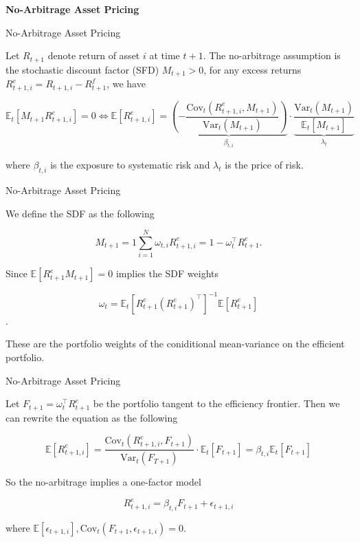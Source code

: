 \documentclass[xcolor={table}, aspectratio=169]{beamer}
\begin{document}
\begin{frame}
	\centering
	\vfill
	{\Large \textbf{No-Arbitrage Asset Pricing}}
	\vfill
\end{frame}

\begin{frame}{No-Arbitrage Asset Pricing}

  Let $R_{t+1}$ denote return of asset $i$ at time $t+1$. The no-arbitrage assumption is the stochastic discount factor (SFD) $M_{t+1}>0$, for any excess returns $R_{t+1,i}^e=R_{t+1,i}-R_{t+1}^f$, we have

  \[\mathbb{E}_t\left[M_{t+1}R_{t+1,i}^e\right]=0\iff \mathbb{E}\left[R_{t+1,i}^e\right]=\underbrace{\left(-\frac{\text{Cov}_t\left(R_{t+1,i}^e,M_{t+1}\right)}{\text{Var}_t(M_{t+1})}\right)}_{\beta_{t,i}}\cdot\underbrace{\frac{\text{Var}_t(M_{t+1})}{\mathbb{E}_t\left[M_{t+1}\right]}}_{\lambda_t}\]

  where $\beta_{t,i}$ is the exposure to systematic risk and $\lambda_t$ is the price of risk. 

\end{frame}

\begin{frame}{No-Arbitrage Asset Pricing}

  We define the SDF as the following

  \[
  M_{t+1}=1\sum_{i=1}^N\omega_{t,i}R_{t+1,i}^e=1-\omega_t^\top R_{t+1}^e.
  \]

  Since $\mathbb{E}\left[R_{t+1}^eM_{t+1}\right]=0$ implies the SDF weights 

  \[\omega_t=\mathbb{E}_t\left[R_{t+1}^e(R^e_{t+1})^\top\right]^{-1}\mathbb{E}\left[R_{t+1}^e\right]\].

  These are the portfolio weights of the coniditional mean-variance on the efficient portfolio.

\end{frame}

\begin{frame}{No-Arbitrage Asset Pricing}

  Let $F_{t+1}=\omega_t^\top R_{t+1}^e$  be the portfolio tangent to the efficiency frontier. Then we can rewrite the equation as the following

  \[
  \mathbb{E}\left[R_{t+1,i}^e\right]=\frac{\text{Cov}_t\left(R_{t+1,i}^e,F_{t+1}\right)}{\text{Var}_t(F_{T+1})}\cdot\mathbb{E}_t\left[F_{t+1}\right]=\beta_{t,i}\mathbb{E}_t\left[F_{t+1}\right]
  \]

  So the no-arbitrage implies a one-factor model

  \[R_{t+1,i}^e=\beta_{t,i}F_{t+1}+\epsilon_{t+1,i}\]

  where $\mathbb{E}\left[\epsilon_{t+1,i}\right],\text{Cov}_t\left(F_{t+1},\epsilon_{t+1,i}\right)=0$.


\end{frame}
\end{document}
